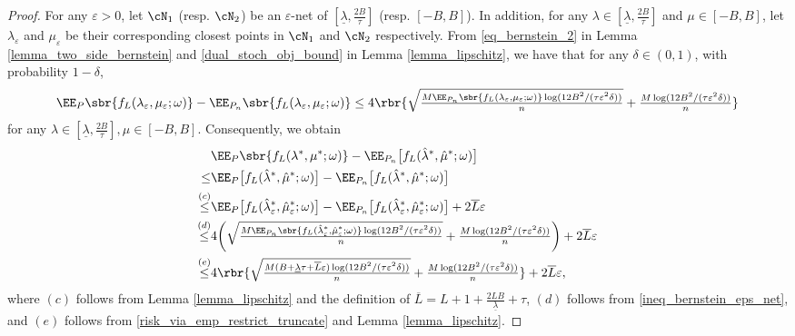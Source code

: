 \documentclass[9pt]{article} %
\numberwithin{equation}{section}
\renewcommand{\frac}[2]{\tfrac{#1}{#2}}
\begin{document}
\begin{proof}
For any $\varepsilon > 0$, let $\cN_1$ (resp. $\cN_2$) be an $\varepsilon$-net of $[\underline{\lambda}, \frac{2B}{\tau}]$ (resp. $[-B, B]$). 
In addition, for any $\lambda \in  [\underline{\lambda}, \frac{2B}{\tau}]$ and $\mu \in [-B, B]$, let 
$\lambda_\varepsilon$ and $\mu_\varepsilon$ be their corresponding closest points in $\cN_1$ and $\cN_2$ respectively. 
From \eqref{eq_bernstein_2} in Lemma \ref{lemma_two_side_bernstein} and \eqref{dual_stoch_obj_bound} in Lemma \ref{lemma_lipschitz}, we have that for any $\delta \in (0,1)$, with probability $1-\delta$,
\begin{align}\label{ineq_bernstein_eps_net}
{
\EE_{P} \sbr{f_L (\lambda_\varepsilon, \mu_\varepsilon; \omega)}  - \EE_{P_n} \sbr{f_L (\lambda_\varepsilon, \mu_\varepsilon; \omega)}
}
\leq 
 4 \rbr{
\sqrt{\frac{ M  {\EE_{P_n} \sbr{f_L (\lambda_\varepsilon, \mu_\varepsilon; \omega) }
} \log(12B^2/(\tau \varepsilon^2 \delta))}{n}} + \frac{ M \log(12B^2/(\tau \varepsilon^2 \delta))}{n} 
}
\end{align}
for any $ \lambda \in [\underline{\lambda}, \frac{2B}{\tau}], \mu \in [-B, B]$.
Consequently, we obtain
\begin{align}
&  \EE_{P} \sbr{f_L (\lambda^*, \mu^*; \omega)}
- 
\EE_{P_n} \big[{f_L (\hat{\lambda}^*, \hat{\mu}^*; \omega)} \big] \nonumber \\ 
 \leq &   \EE_{P} \big[{f_L (\hat \lambda^*, \hat \mu^*; \omega)} \big] 
-  \EE_{P_n} \big[{f_L (\hat{\lambda}^*, \hat{\mu}^*; \omega)} \big]  \nonumber  \\
 \overset{(c)}{\leq} &   \EE_{P} \big[{f_L (\hat{\lambda}^*_\varepsilon, \hat{\mu}^*_\varepsilon; \omega)}\big] 
-  \EE_{P_n} \big[{f_L (\hat{\lambda}^*_\varepsilon, \hat{\mu}^*_\varepsilon; \omega)} \big] + 2 \overline{L} \varepsilon \nonumber \\
 \overset{(d)}{\leq}  &  
 4 \bigg({
\sqrt{\frac{ M  {\EE_{P_n} \sbr{f_L (\hat \lambda^*_\varepsilon, \hat \mu^*_\varepsilon; \omega) }
} \log(12B^2/(\tau \varepsilon^2 \delta))}{n}} + \frac{ M \log(12B^2/(\tau \varepsilon^2 \delta))}{n} 
} \bigg) + 2 \overline{L} \varepsilon \nonumber  \\
 \overset{(e)}{\leq}  &   
  4 \rbr{
\sqrt{\frac{ M 
(B + \underline{\lambda} \tau + \overline{L} \varepsilon)
 \log(12B^2/(\tau \varepsilon^2 \delta))}{n}} + \frac{ M \log(12B^2/(\tau \varepsilon^2 \delta))}{n} 
}  + 2 \overline{L} \varepsilon, 
\label{pop_emp_min_loss_diff_1}
\end{align}
where 
$(c)$ follows from Lemma \ref{lemma_lipschitz} and the definition of $\overline{L} =  {L+1 +  \frac{2LB}{\underline{\lambda}} + \tau}$, $(d)$ follows from \eqref{ineq_bernstein_eps_net}, and $(e)$ follows from \eqref{risk_via_emp_restrict_truncate} and Lemma \ref{lemma_lipschitz}.


\end{proof}
\end{document}
